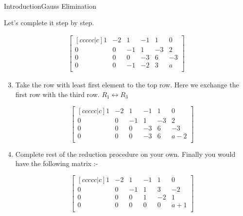 \documentclass[10pt]{beamer}
\begin{document}
\begin{frame}[shrink=20]{Introduction}{Gauss Elimination}


Let's complete it step by step.

\begin{align}
\begin{bmatrix}[ccccc|c]  1 & -2 & 1 & -1 & 1 &  0 \\  0 & 0 & -1 & 1 & -3 &  2\\ 0 & 0 & 0 & -3 & 6 &  -3\\ 0 & 0 & -1 & -2 & 3 &  a\\ \end{bmatrix}
\end{align}

\begin{enumerate}
\setcounter{enumi}{2}

\pause
\item  Take the row with least first element to the top row. Here we exchange the first row with the third row. $R_{1} \leftrightarrow R_{3}$ 

\begin{equation}
\begin{bmatrix}[ccccc|c] 1 & -2 & 1 & -1 & 1 &  0 \\  0 & 0 & -1 & 1 & -3 &  2\\ 0 & 0 & 0 & -3 & 6 &  -3\\ 0 & 0 & 0 & -3 & 6 &  a-2\\ \end{bmatrix}
\end{equation}

\pause
\item  Complete rest of the reduction procedure on your own. Finally you would have the following matrix :-

\begin{equation}
\begin{bmatrix}[ccccc|c]  1 & -2 & 1 & -1 & 1 &  0 \\  0 & 0 & -1 & 1 & 3 &  -2\\ 0 & 0 & 0 & 1 & -2 &  1\\ 0 & 0 & 0 & 0 & 0 &  a+1\\ \end{bmatrix}
\end{equation}

\end{enumerate}

\end{frame}
\end{document}
